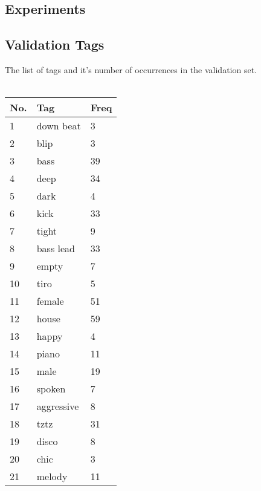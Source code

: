 

\begin{appendices}

\chapter{Experiments}
\section{Validation Tags}
\label{validationtags}
The list of tags and it's number of occurrences in the validation set.\\
\\
\begin{tabular}{| p{} | p{} | p{}|}
\hline
\textbf{No.} & \textbf{Tag} & \textbf{Freq}\\
\hline
1 & down beat & 3\\
\hline
2 & blip & 3 \\
\hline
3 & bass & 39 \\
\hline
4 & deep & 34 \\
\hline
5 & dark & 4\\
\hline
6 & kick & 33\\
\hline
7 & tight & 9\\
\hline
8 & bass lead & 33\\
\hline
9 & empty & 7\\
\hline
10 & tiro & 5\\
\hline
11 & female & 51\\
\hline
12 & house & 59\\
\hline
13 & happy & 4\\
\hline
14 & piano & 11\\
\hline
15 & male & 19\\
\hline
16 & spoken & 7 \\
\hline
17 & aggressive & 8\\
\hline
18 & tztz & 31\\
\hline
19 & disco & 8\\
\hline
20 & chic & 3\\
\hline
21 & melody & 11\\

\end{tabular}
\end{appendices}

